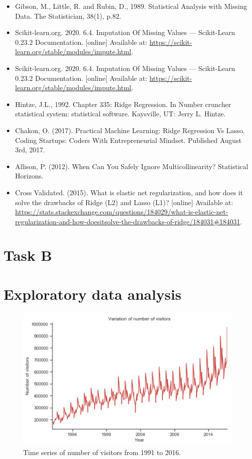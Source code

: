 \documentclass[letterpaper,12pt,twoside,]{pinp}
\providecommand{\tightlist}{%
  \setlength{\itemsep}{0pt}\setlength{\parskip}{0pt}}
\begin{document}
\begin{itemize}
\tightlist
\item
  Gibson, M., Little, R. and Rubin, D., 1989. Statistical Analysis with
  Missing Data. The Statistician, 38(1), p.82.
\item
  Scikit-learn.org. 2020. 6.4. Imputation Of Missing Values ---
  Scikit-Learn 0.23.2 Documentation. {[}online{]} Available at:
  \url{https://scikit-learn.org/stable/modules/impute.html}.
\item
  Scikit-learn.org. 2020. 6.4. Imputation Of Missing Values ---
  Scikit-Learn 0.23.2 Documentation. {[}online{]} Available at:
  \url{https://scikit-learn.org/stable/modules/impute.html}.
\item
  Hintze, J.L., 1992. Chapter 335: Ridge Regression. In Number cruncher
  statistical system: statistical software. Kaysville, UT: Jerry L.
  Hintze.
\item
  Chakon, O. (2017). Practical Machine Learning: Ridge Regression Vs
  Lasso. Coding Startups: Coders With Entrepreneurial Mindset. Published
  August 3rd, 2017.
\item
  Allison, P. (2012). When Can You Safely Ignore Multicollinearity?
  Statistical Horizons.
\item
  Cross Validated. (2015). What is elastic net regularization, and how
  does it solve the drawbacks of Ridge (L2) and Lasso (L1)? {[}online{]}
  Available at:
  \url{https://stats.stackexchange.com/questions/184029/what-is-elastic-net-regularization-and-how-doesitsolve-the-drawbacks-of-ridge/184031\#184031}.
\end{itemize}

\hypertarget{task-b}{%
\section{Task B}\label{task-b}}

\hypertarget{exploratory-data-analysis}{%
\section{Exploratory data analysis}\label{exploratory-data-analysis}}

\begin{figure}
\includegraphics[width=1\linewidth]{timeseries.png}
\centering
\caption{Time series of number of visitors from 1991 to 2016.}
\label{fig:timeseries}
\end{figure}
\end{document}
